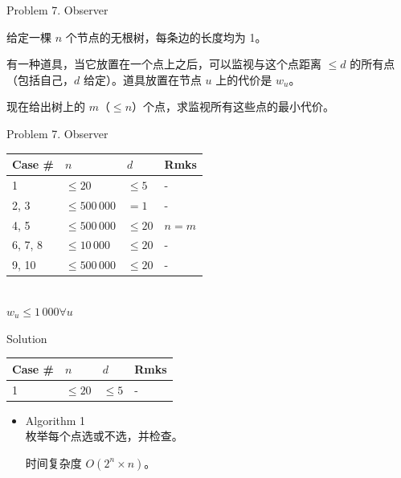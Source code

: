 \documentclass[UTF8]{beamer}
\begin{document}

\begin{frame}{Problem 7. Observer}

给定一棵 $n$ 个节点的无根树，每条边的长度均为 1。

有一种道具，当它放置在一个点上之后，可以监视与这个点距离 $\leq d$ 的所有点
（包括自己，$d$ 给定）。道具放置在节点 $u$ 上的代价是 $w_u$。

现在给出树上的 $m$（$ \leq n$）个点，求监视所有这些点的最小代价。

\end{frame}

\begin{frame}{Problem 7. Observer}

\begin{tabularx}{\textwidth}{X|X|X|X} \hline
Case \# & $n$ & $d$ & Rmks \\ \hline \hline
1       & $\leq 20$       & $\leq 5$  & - \\ \hline
2, 3    & $\leq 500\,000$ & $= 1$     & - \\ \hline
4, 5    & $\leq 500\,000$ & $\leq 20$ & $n = m$ \\ \hline
6, 7, 8 & $\leq 10\,000$  & $\leq 20$ & - \\ \hline
9, 10   & $\leq 500\,000$ & $\leq 20$ & - \\ \hline
\end{tabularx}
\\
$w_u \leq 1\,000 \forall u$

\end{frame}

\begin{frame}{Solution}

\begin{tabularx}{\textwidth}{X|X|X|X} \hline
Case \# & $n$ & $d$ & Rmks \\ \hline \hline
1       & $\leq 20$       & $\leq 5$  & - \\ \hline
\end{tabularx}
\begin{itemize}
    \item Algorithm 1 \\
        枚举每个点选或不选，并检查。

        时间复杂度 $O(2^n \times n)$。
\end{itemize}

\end{frame}
\end{document}
